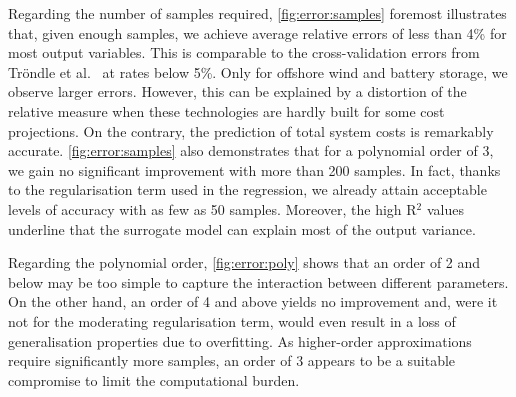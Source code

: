 Regarding the number of samples required, \cref{fig:error:samples} foremost
illustrates that, given enough samples, we achieve average relative errors of
less than 4\% for most output variables. This is comparable to the
cross-validation errors from Tröndle et al.~\cite{trondle_trade-offs_2020} at
rates below 5\%. Only for offshore wind and battery storage, we observe larger
errors. However, this can be explained by a distortion of the relative measure
when these technologies are hardly built for some cost projections. On the
contrary, the prediction of total system costs is remarkably accurate.
\cref{fig:error:samples} also demonstrates that for a polynomial order of 3, we
gain no significant improvement with more than 200 samples. In fact, thanks to
the regularisation term used in the regression, we already attain acceptable
levels of accuracy with as few as 50 samples. Moreover, the high R$^2$ values
underline that the surrogate model can explain most of the output variance.

Regarding the polynomial order, \cref{fig:error:poly} shows that an order of 2
and below may be too simple to capture the interaction between different
parameters. On the other hand, an order of 4 and above yields no improvement
and, were it not for the moderating regularisation term, would even result in a
loss of generalisation properties due to overfitting. As higher-order
approximations require significantly more samples, an order of 3 appears to be a
suitable compromise to limit the computational burden.
